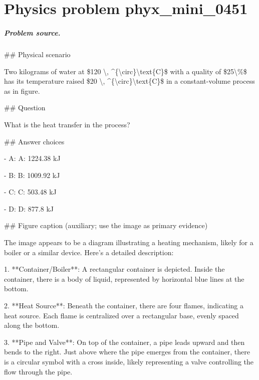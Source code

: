 
\chapter{Physics problem phyx\_mini\_0451}
\label{ch:PhyXMiniProblems_problem_phyx_mini_0451}

\paragraph{Problem source.}
\#\# Physical scenario

Two kilograms of water at \$120 \textbackslash{}, \textasciicircum{}\{\textbackslash{}circ\}\textbackslash{}text\{C\}\$ with a quality of \$25\textbackslash{}\%\$ has its temperature raised \$20 \textbackslash{}, \textasciicircum{}\{\textbackslash{}circ\}\textbackslash{}text\{C\}\$ in a constant-volume process as in figure.

\#\# Question

What is the heat transfer in the process?

\#\# Answer choices

- A: A: 1224.38 kJ

- B: B: 1009.92 kJ

- C: C: 503.48 kJ

- D: D: 877.8 kJ

\#\# Figure caption (auxiliary; use the image as primary evidence)

The image appears to be a diagram illustrating a heating mechanism, likely for a boiler or a similar device. Here's a detailed description:

1. **Container/Boiler**: A rectangular container is depicted. Inside the container, there is a body of liquid, represented by horizontal blue lines at the bottom.

2. **Heat Source**: Beneath the container, there are four flames, indicating a heat source. Each flame is centralized over a rectangular base, evenly spaced along the bottom.

3. **Pipe and Valve**: On top of the container, a pipe leads upward and then bends to the right. Just above where the pipe emerges from the container, there is a circular symbol with a cross inside, likely representing a valve controlling the flow through the pipe.

